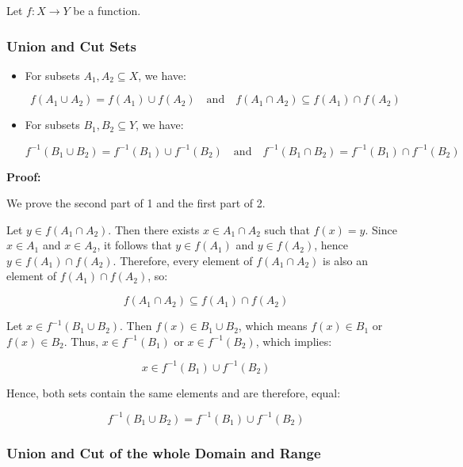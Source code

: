 Let \( f : X \to Y \) be a function.

\subsubsection{Union and Cut Sets}

\begin{itemize}

	\item For subsets \( A_1, A_2 \subseteq X \), we have:

	      \[
		      f(A_1 \cup A_2) = f(A_1) \cup f(A_2)
		      \quad \text{and} \quad
		      f(A_1 \cap A_2) \subseteq f(A_1) \cap f(A_2)
	      \]

	\item For subsets \( B_1, B_2 \subseteq Y \), we have:
	      
	      \[
		      f^{-1}(B_1 \cup B_2) = f^{-1}(B_1) \cup f^{-1}(B_2)
		      \quad \text{and} \quad
		      f^{-1}(B_1 \cap B_2) = f^{-1}(B_1) \cap f^{-1}(B_2)
	      \]
\end{itemize}

\textbf{Proof:}

We prove the second part of 1 and the first part of 2.

Let \( y \in f(A_1 \cap A_2) \). Then there exists \( x \in A_1 \cap A_2 \) such that 
\( f(x) = y \). Since \( x \in A_1 \) and \( x \in A_2 \), it follows that \( y \in f(A_1) \) 
and \( y \in f(A_2) \), hence \( y \in f(A_1) \cap f(A_2) \). Therefore, every element of 
\( f(A_1 \cap A_2) \) is also an element of \( f(A_1) \cap f(A_2) \), so:

\[
	f(A_1 \cap A_2) \subseteq f(A_1) \cap f(A_2)
\]

Let \( x \in f^{-1} (B_1 \cup B_2) \). Then \( f(x) \in B_1 \cup B_2 \), which means \( f(x) \in B_1 \) 
or \( f(x) \in B_2 \). Thus, \( x \in f^{-1}(B_1) \) 
or \( x \in f^{-1}(B_2) \), which implies:
	      
\[
	 x \in f^{-1}(B_1) \cup f^{-1}(B_2)
\]

Hence, both sets contain the same elements and are therefore, equal:
	      
\[
	f^{-1}(B_1 \cup B_2) = f^{-1}(B_1) \cup f^{-1}(B_2)
\]

\QED

\subsubsection{Union and Cut of the whole Domain and Range}


